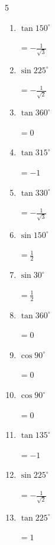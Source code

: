 \begin{multicols}{5}
\begin{enumerate}
  \item $\displaystyle \tan{150^\circ}$

        $\displaystyle =-\frac{1}{\sqrt{3}}$

\columnbreak %

\resetques

  \item $\displaystyle \sin{225^\circ}$

        $\displaystyle =-\frac{1}{\sqrt{2}}$

  \item $\displaystyle \tan{360^\circ}$

        $\displaystyle =0$

  \item $\displaystyle \tan{315^\circ}$

        $\displaystyle =-1$

  \item $\displaystyle \tan{330^\circ}$

        $\displaystyle =-\frac{1}{\sqrt{3}}$

  \item $\displaystyle \sin{150^\circ}$

        $\displaystyle =\frac{1}{2}$

  \item $\displaystyle \sin{30^\circ}$

        $\displaystyle =\frac{1}{2}$

  \item $\displaystyle \tan{360^\circ}$

        $\displaystyle =0$

  \item $\displaystyle \cos{90^\circ}$

        $\displaystyle =0$

  \item $\displaystyle \cos{90^\circ}$

        $\displaystyle =0$

  \item $\displaystyle \tan{135^\circ}$

        $\displaystyle =-1$

  \item $\displaystyle \sin{225^\circ}$

        $\displaystyle =-\frac{1}{\sqrt{2}}$

  \item $\displaystyle \tan{225^\circ}$

        $\displaystyle =1$


\end{enumerate}
\end{multicols}
